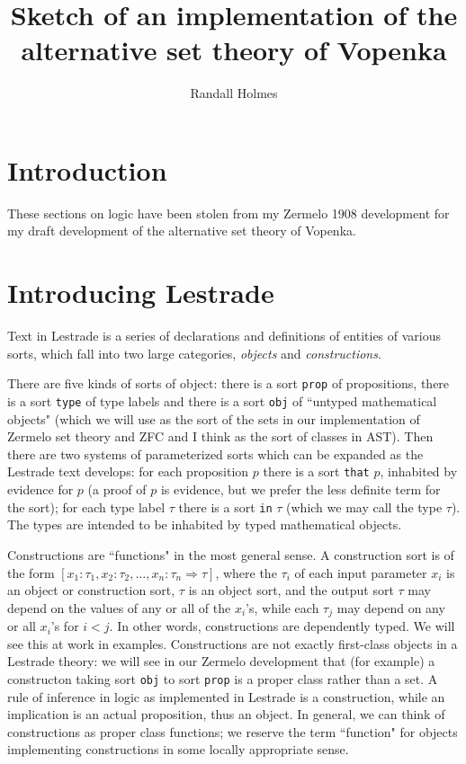 \documentclass[12pt]{article}
\title{Sketch of an implementation of the alternative set theory of Vopenka}
\author{Randall Holmes}
\begin{document}
\maketitle


\section{Introduction}
 




These sections on logic have been stolen from my Zermelo 1908 development for my draft development of the alternative set theory of Vopenka.

\section{Introducing Lestrade}

Text in Lestrade is a series of declarations and definitions of entities of various sorts, which fall into two large categories, {\em objects\/} and {\em constructions\/}.

There are five kinds of sorts of object:  there is a sort {\tt prop} of propositions, there is a sort {\tt type} of type labels and there is a sort {\tt obj} of ``untyped mathematical objects" (which we will use as the sort of the sets in our implementation of Zermelo set theory and ZFC and I think as the sort of classes in AST).  Then there are two systems of parameterized sorts which can be expanded as the Lestrade text develops:  for each proposition $p$ there is a sort {\tt that} $p$, inhabited by evidence for $p$ (a proof of $p$ is evidence, but we prefer the less definite term for the sort);  for each type label $\tau$ there is a sort {\tt in} $\tau$ (which we may call the type $\tau$).  The types are intended to be inhabited by typed  mathematical objects.

Constructions are ``functions" in the most general sense.  A construction sort is of the form $[x_1:\tau_1,x_2:\tau_2,\ldots,x_n:\tau_n \Rightarrow \tau]$, where the $\tau_i$ of each input parameter $x_i$  is an object or construction sort, $\tau$ is an object sort, and the output sort $\tau$ may depend on the values of any or all of the $x_i$'s, while each $\tau_j$ may depend on any or all $x_i$'s for $i<j$.  In other words, constructions are dependently typed.  We will see this at work in examples.  Constructions are not exactly first-class objects in a Lestrade theory:  we will see in our Zermelo development that (for example) a constructon taking sort {\tt obj} to sort {\tt prop} is a proper class rather than a set.   A rule of inference in logic as implemented in Lestrade is a construction, while an implication is an actual proposition, thus an object.  In general, we can think of constructions as proper class functions;  we reserve the term ``function" for objects implementing constructions in some locally appropriate sense.
\end{document}
